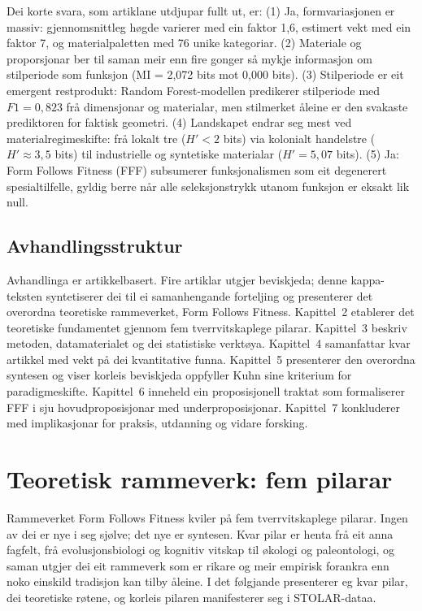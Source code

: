 \documentclass[10pt, a4paper, twocolumn]{article}
\begin{document}
Dei korte svara, som artiklane utdjupar fullt ut, er: (1) Ja, formvariasjonen er massiv: gjennomsnittleg høgde varierer med ein faktor 1,6, estimert vekt med ein faktor 7, og materialpaletten med 76 unike kategoriar. (2) Materiale og proporsjonar ber til saman meir enn fire gonger så mykje informasjon om stilperiode som funksjon (MI = 2,072 bits mot 0,000 bits). (3) Stilperiode er eit emergent restprodukt: Random Forest-modellen predikerer stilperiode med $F1 = 0{,}823$ frå dimensjonar og materialar, men stilmerket åleine er den svakaste prediktoren for faktisk geometri. (4) Landskapet endrar seg mest ved materialregimeskifte: frå lokalt tre ($H' < 2$ bits) via kolonialt handelstre ($H' \approx 3{,}5$ bits) til industrielle og syntetiske materialar ($H' = 5{,}07$ bits). (5) Ja: Form Follows Fitness (FFF) subsumerer funksjonalismen som eit degenerert spesialtilfelle, gyldig berre når alle seleksjonstrykk utanom funksjon er eksakt lik null.

\subsection{Avhandlingsstruktur}

Avhandlinga er artikkelbasert. Fire artiklar utgjer beviskjeda; denne kappa-teksten syntetiserer dei til ei samanhengande forteljing og presenterer det overordna teoretiske rammeverket, Form Follows Fitness. Kapittel~2 etablerer det teoretiske fundamentet gjennom fem tverrvitskaplege pilarar. Kapittel~3 beskriv metoden, datamaterialet og dei statistiske verktøya. Kapittel~4 samanfattar kvar artikkel med vekt på dei kvantitative funna. Kapittel~5 presenterer den overordna syntesen og viser korleis beviskjeda oppfyller Kuhn sine kriterium for paradigmeskifte. Kapittel~6 inneheld ein proposisjonell traktat som formaliserer FFF i sju hovudproposisjonar med underproposisjonar. Kapittel~7 konkluderer med implikasjonar for praksis, utdanning og vidare forsking.


\section{Teoretisk rammeverk: fem pilarar}

Rammeverket Form Follows Fitness kviler på fem tverrvitskaplege pilarar. Ingen av dei er nye i seg sjølve; det nye er syntesen. Kvar pilar er henta frå eit anna fagfelt, frå evolusjonsbiologi og kognitiv vitskap til økologi og paleontologi, og saman utgjer dei eit rammeverk som er rikare og meir empirisk forankra enn noko einskild tradisjon kan tilby åleine. I det følgjande presenterer eg kvar pilar, dei teoretiske røtene, og korleis pilaren manifesterer seg i STOLAR-dataa.
\end{document}
